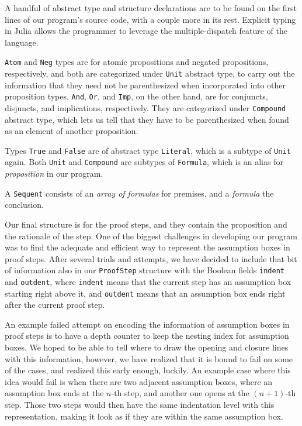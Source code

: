 \documentclass[12pt]{article}
\begin{document}
A handful of abstract type and structure declarations are to be found
on the first lines of our program's source code, with a couple more
in its rest. Explicit typing in Julia allows the programmer to leverage
the multiple-dispatch feature of the language.

\verb|Atom| and \verb|Neg| types are for atomic propositions and
negated propositions, respectively, and both are categorized under \verb|Unit|
abstract type, to carry out the information that they need not be
parenthesized when incorporated into other proposition types.
\verb|And|, \verb|Or|, and \verb|Imp|, on the other hand, are for
conjuncts, disjuncts, and implications, respectively. They are
categorized under \verb|Compound| abstract type, which lets us tell
that they have to be parenthesized when found as an element of another
proposition.

Types \verb|True| and \verb|False| are of abstract type \verb|Literal|,
which is a subtype of \verb|Unit| again. Both \verb|Unit| and
\verb|Compound| are subtypes of \verb|Formula|, which is an alias
for \textit{proposition} in our program.

A \verb|Sequent| consists of an \textit{array of formulas} for premises, and
a \textit{formula} the conclusion.

Our final structure is for the proof steps, and they contain
the proposition and the rationale of the step. One of the biggest
challenges in developing our program was to find the adequate
and efficient way to represent the assumption boxes in proof steps.
After several trials and attempts, we have decided to include
that bit of information also in our \verb|ProofStep| structure
with the Boolean fields \verb|indent| and \verb|outdent|, where
\verb|indent| means that the current step has an assumption box
starting right above it, and \verb|outdent| means that an assumption
box ends right after the current proof step.

An example failed attempt on encoding the information of assumption
boxes in proof steps is to have a depth counter to keep the nesting
index for assumption boxes. We hoped to be able to tell where to
draw the opening and closure lines with this information, however,
we have realized that it is bound to fail on some of the cases,
and realized this early enough, luckily. An example case where this
idea would fail is when there are two adjacent assumption boxes,
where an assumption box ends at the $n$-th step, and another one
opens at the $(n + 1)$-th step. Those two steps would then have
the same indentation level with this representation, making it look
as if they are within the same assumption box.
\end{document}
